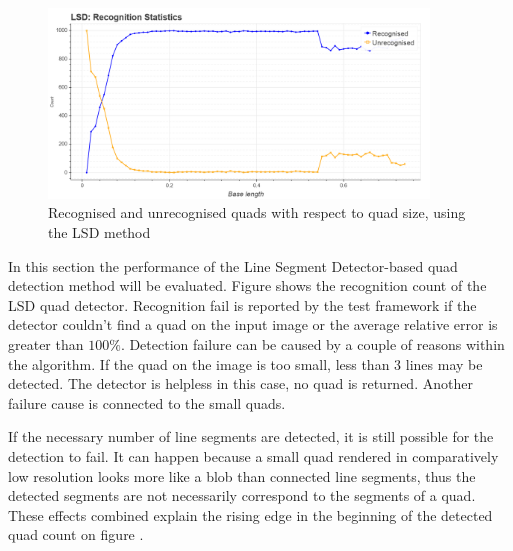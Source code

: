 \begin{figure}[ht]
	\centering
	\includegraphics[width=0.9\textwidth]{figures/plots/lsd_rec_unrec_count.png}
	\caption{Recognised and unrecognised quads with respect to quad size, using the LSD method}
	\label{fig:lsdRecCnt}
\end{figure}
In this section the performance of the Line Segment Detector-based quad detection method will be evaluated.
Figure  shows the recognition count of the LSD quad detector.
Recognition fail is reported by the test framework if the detector couldn't find a quad on the input image or the average relative error is greater than $100\%$.
Detection failure can be caused by a couple of reasons within the algorithm.
If the quad on the image is too small, less than 3 lines may be detected.
The detector is helpless in this case, no quad is returned.
Another failure cause is connected to the small quads.

If the necessary number of line segments are detected, it is still possible for the detection to fail.
It can happen because a small quad rendered in comparatively low resolution looks more like a blob than connected line segments, thus the detected segments are not necessarily correspond to the segments of a quad.
These effects combined explain the rising edge in the beginning of the detected quad count on figure .

